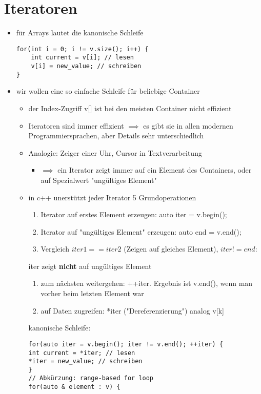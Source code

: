 \documentclass[a4paper]{scrartcl}
\theoremstyle{definition}
\theoremstyle{plain}
\theoremstyle{remark}
\theoremstyle{remark}
\begin{document}
\section{Iteratoren}
\label{sec-12}
\begin{itemize}
\item für Arrays lautet die kanonische Schleife
\begin{verbatim}
for(int i = 0; i != v.size(); i++) {
	int current = v[i]; // lesen
	v[i] = new_value; // schreiben
}
\end{verbatim}
\item wir wollen eine so einfache Schleife für beliebige Container
\begin{itemize}
\item der Index-Zugriff v[] ist bei den meisten Container nicht effizient
\item Iteratoren sind immer effizient $\implies$ es gibt sie in allen modernen Programmiersprachen, aber Details sehr unterschiedlich
\item Analogie: Zeiger einer Uhr, Cursor in Textverarbeitung
\begin{itemize}
\item $\implies$ ein Iterator zeigt immer auf ein Element des Containers, oder auf Spezialwert "ungültiges Element"
\end{itemize}
\item in c++ unerstützt jeder Iterator 5 Grundoperationen
\begin{enumerate}
\item Iterator auf erstes Element erzeugen: auto iter = v.begin();
\item Iterator auf "ungültiges Element" erzeugen: auto end = v.end();
\item Vergleich $iter1 == iter2$ (Zeigen auf gleiches Element), $iter != end$:
\end{enumerate}
iter zeigt \textbf{nicht} auf ungültiges Element
\begin{enumerate}
\item zum nächsten weitergehen: ++iter. Ergebnis ist v.end(), wenn man vorher beim letzten Element war
\item auf Daten zugreifen: *iter ("Dereferenzierung") analog v[k]
\end{enumerate}
kanonische Schleife:
\begin{verbatim}
for(auto iter = v.begin(); iter != v.end(); ++iter) {
int current = *iter; // lesen
*iter = new_value; // schreiben
}
// Abkürzung: range-based for loop
for(auto & element : v) {

\end{verbatim}
\end{itemize}
\end{itemize}
\end{document}
